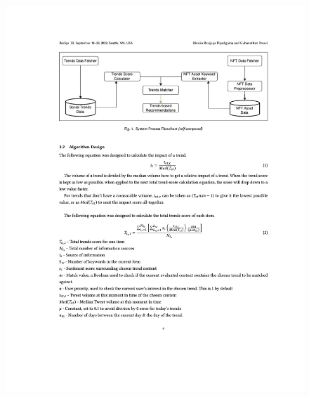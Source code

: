 \begin{figure}[h!]
\centering
\includegraphics[width=\textwidth]{images/appendix/papers/trends/Exploration of the possibility of infusing Social Media Trends into generating NFT Recommendations 4.jpeg}
\end{figure}

